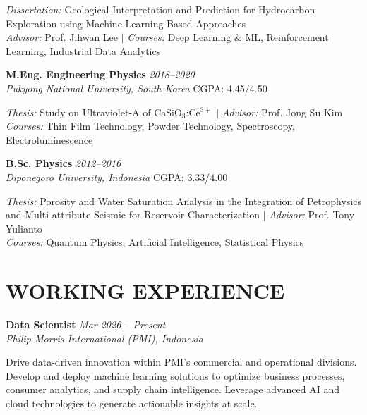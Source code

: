 \documentclass[10pt,a4paper]{article}
\newcommand{\experience}[4]{%
    \noindent\textbf{#1} \hfill \textit{#2}\\
    \textit{#3} \hfill #4\vspace{2pt}
}
\newcommand{\education}[4]{%
    \noindent\textbf{#1} \hfill \textit{#2}\\
    \textit{#3} \hfill #4\vspace{2pt}
}
\begin{document}
\textit{Dissertation:} Geological Interpretation and Prediction for Hydrocarbon Exploration using Machine Learning-Based Approaches\\
\textit{Advisor:} Prof. Jihwan Lee $\mid$ \textit{Courses:} Deep Learning \& ML, Reinforcement Learning, Industrial Data Analytics

\vspace{4pt}

\education{M.Eng. Engineering Physics}{2018--2020}{Pukyong National University, South Korea}{CGPA: 4.45/4.50}

\textit{Thesis:} Study on Ultraviolet-A of CaSiO$_3$:Ce$^{3+}$ $\mid$ \textit{Advisor:} Prof. Jong Su Kim\\
\textit{Courses:} Thin Film Technology, Powder Technology, Spectroscopy, Electroluminescence

\vspace{4pt}

\education{B.Sc. Physics}{2012--2016}{Diponegoro University, Indonesia}{CGPA: 3.33/4.00}

\textit{Thesis:} Porosity and Water Saturation Analysis in the Integration of Petrophysics and Multi-attribute Seismic for Reservoir Characterization $\mid$ \textit{Advisor:} Prof. Tony Yulianto\\
\textit{Courses:} Quantum Physics, Artificial Intelligence, Statistical Physics

\vspace{2pt}

\section*{WORKING EXPERIENCE}

\experience{Data Scientist}{Mar 2026 -- Present}{Philip Morris International (PMI), Indonesia}{}

Drive data-driven innovation within PMI's commercial and operational divisions. Develop and deploy machine learning solutions to optimize business processes, consumer analytics, and supply chain intelligence. Leverage advanced AI and cloud technologies to generate actionable insights at scale.
\end{document}
